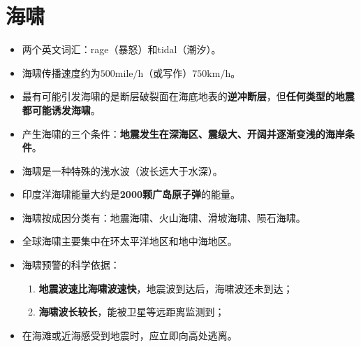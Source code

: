 \documentclass[twoside,titlepage,hyperref,UTF8,12pt]{ctexart}
\begin{document}
\section{海啸}
\begin{itemize}
    \item 两个英文词汇：rage（暴怒）和tidal（潮汐）。
    \item 海啸传播速度约为$500\mathrm{mile/h}$（或写作）$750\mathrm{km/h}$。
    \item 最有可能引发海啸的是断层破裂面在海底地表的\textbf{逆冲断层}，但\textbf{任何类型的地震都可能诱发海啸}。
    \item 产生海啸的三个条件：\textbf{地震发生在深海区、震级大、开阔并逐渐变浅的海岸条件}。
    \item 海啸是一种特殊的浅水波（波长远大于水深）。
    \item 印度洋海啸能量大约是\textbf{2000颗广岛原子弹}的能量。
    \item 海啸按成因分类有：地震海啸、火山海啸、滑坡海啸、陨石海啸。
    \item 全球海啸主要集中在环太平洋地区和地中海地区。
    \item 海啸预警的科学依据：
        \begin{enumerate}
            \item \textbf{地震波速比海啸波速快}，地震波到达后，海啸波还未到达；
            \item \textbf{海啸波长较长}，能被卫星等远距离监测到；
        \end{enumerate}
    \item 在海滩或近海感受到地震时，应立即向高处逃离。
\end{itemize}

\newpage
\appendix
\appendixpage{}
\end{document}
